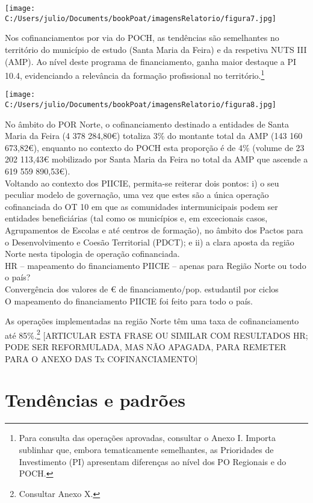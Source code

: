 \documentclass[
]{book}
\begin{document}
\texttt{[image: C:/Users/julio/Documents/bookPoat/imagensRelatorio/figura7.jpg]}

Nos cofinanciamentos por via do POCH, as tendências são semelhantes no território do município de estudo (Santa Maria da Feira) e da respetiva NUTS III (AMP). Ao nível deste programa de financiamento, ganha maior destaque a PI 10.4, evidenciando a relevância da formação profissional no território.\footnote{Para consulta das operações aprovadas, consultar o Anexo I.
  Importa sublinhar que, embora tematicamente semelhantes, as Prioridades de Investimento (PI) apresentam diferenças ao nível dos PO Regionais e do POCH.}

\texttt{[image: C:/Users/julio/Documents/bookPoat/imagensRelatorio/figura8.jpg]}

No âmbito do POR Norte, o cofinanciamento destinado a entidades de Santa Maria da Feira (4 378 284,80€) totaliza 3\% do montante total da AMP (143 160 673,82€), enquanto no contexto do POCH esta proporção é de 4\% (volume de 23 202 113,43€ mobilizado por Santa Maria da Feira no total da AMP que ascende a 619 559 890,53€).\\
Voltando ao contexto dos PIICIE, permita-se reiterar dois pontos: i) o seu peculiar modelo de governação, uma vez que estes são a única operação cofinanciada do OT 10 em que as comunidades intermunicipais podem ser entidades beneficiárias (tal como os municípios e, em excecionais casos, Agrupamentos de Escolas e até centros de formação), no âmbito dos Pactos para o Desenvolvimento e Coesão Territorial (PDCT); e ii) a clara aposta da região Norte nesta tipologia de operação cofinanciada.\\
HR -- mapeamento do financiamento PIICIE -- apenas para Região Norte ou todo o país?\\
Convergência dos valores de € de financiamento/pop. estudantil por ciclos\\
O mapeamento do financiamento PIICIE foi feito para todo o país.

As operações implementadas na região Norte têm uma taxa de cofinanciamento até 85\%.\footnote{Consultar Anexo X.}
{[}ARTICULAR ESTA FRASE OU SIMILAR COM RESULTADOS HR; PODE SER REFORMULADA, MAS NÃO APAGADA, PARA REMETER PARA O ANEXO DAS Tx COFINANCIAMENTO{]}

\hypertarget{tenduxeancias-e-padruxf5es}{%
\section{Tendências e padrões}\label{tenduxeancias-e-padruxf5es}}
\end{document}
